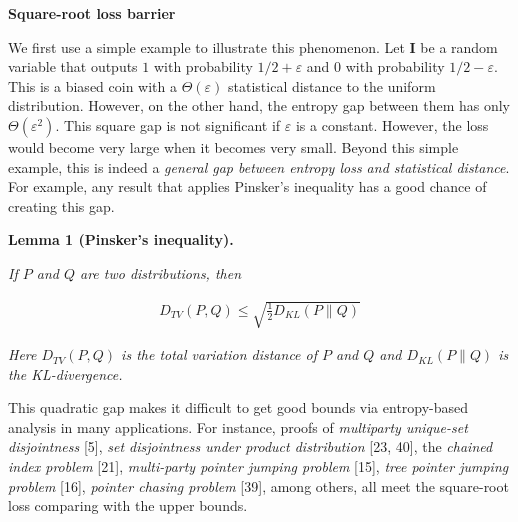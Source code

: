 \documentclass[10pt,a4paper]{article}
\begin{document}
\par\medskip\noindent\textbf{Square-root loss barrier}\par




We first use a simple example to illustrate this phenomenon. Let $\bm{I}$ be a random variable that outputs $1$ with probability $1/2+\varepsilon$ and $0$ with probability $1/2-\varepsilon$. This is a biased coin with a $\Theta(\varepsilon)$ statistical distance to the uniform distribution. However, on the other hand, the entropy gap between them has only $\Theta(\varepsilon^{2})$. This square gap is not significant if $\varepsilon$ is a constant. However, the loss would become very large when it becomes very small. Beyond this simple example, this is indeed a \emph{general gap between entropy loss and statistical distance}. For example, any result that applies Pinsker’s inequality has a good chance of creating this gap.\par





\par\medskip\noindent\textbf{
\textbf{Lemma 1}\textbf{ }(Pinsker’s inequality)\textbf{.}
}\par



\emph{If $P$ and $Q$ are two distributions, then}\par


\[\begin{gathered}
D_{TV}(P,Q)\leq\sqrt{\frac{1}{2}D_{KL}(P\|Q)}
\end{gathered}\]


\emph{Here $D_{TV}(P,Q)$ is the total variation distance of $P$ and $Q$ and $D_{KL}(P\|Q)$ is the KL-divergence.}\par






This quadratic gap makes it difficult to get good bounds via entropy-based analysis in many applications. For instance, proofs of \emph{multiparty unique-set disjointness} [5], \emph{set disjointness under product distribution} [23, 40], the \emph{chained index problem} [21], \emph{multi-party pointer jumping problem} [15], \emph{tree pointer jumping problem} [16], \emph{pointer chasing problem} [39], among others, all meet the square-root loss comparing with the upper bounds.\par
\end{document}
